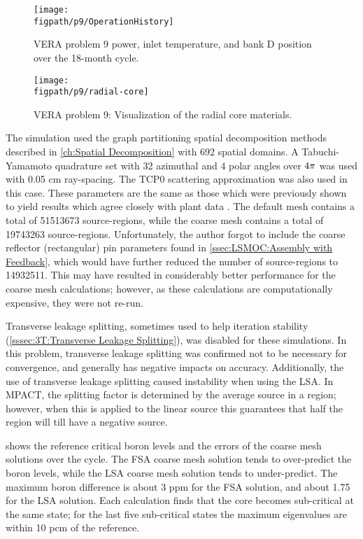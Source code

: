 {{{      \begin{figure}[h]
        \centering
        \texttt{[image: \\figpath/p9/OperationHistory]}
        \caption{VERA problem 9 power, inlet temperature, and bank D position over the 18-month cycle. \label{fig:LSMOC:P9:Operation}}
      \end{figure}

      \begin{figure}[h]
        \centering
        \texttt{[image: \\figpath/p9/radial-core]}
        \caption{VERA problem 9: Visualization of the radial core materials. \label{fig:LSMOC:P9:Radial Core}}
      \end{figure}

      The simulation used the graph partitioning spatial decomposition methods described in \cref{ch:Spatial Decomposition} with 692 spatial domains.
      A Tabuchi-Yamamoto quadrature set with 32 azimuthal and 4 polar angles over $4\pi$ was used with 0.05 cm ray-spacing.
      The TCP0 scattering approximation was also used in this case.
      These parameters are the same as those which were previously shown to yield results which agree closely with plant data \cite{VERA}.
      The default mesh contains a total of 51513673 source-regions, while the coarse mesh contains a total of 19743263 source-regions.
      Unfortunately, the author forgot to include the coarse reflector (rectangular) pin parameters found in \cref{ssec:LSMOC:Assembly with Feedback}, which would have further reduced the number of source-regions to 14932511.
      This may have resulted in considerably better performance for the coarse mesh calculations; however, as these calculations are computationally expensive, they were not re-run.

      Transverse leakage splitting, sometimes used to help iteration stability (\cref{sssec:3T:Transverse Leakage Splitting}), was disabled for these simulations.
      In this problem, transverse leakage splitting was confirmed not to be necessary for convergence, and generally has negative impacts on accuracy.
      Additionally, the use of transverse leakage splitting caused instability when using the \ac{LSA}.
      In MPACT, the splitting factor is determined by the average source in a region; however, when this is applied to the linear source this guarantees that half the region will till have a negative source.

       shows the reference critical boron levels and the errors of the coarse mesh solutions over the cycle.
      The \ac{FSA} coarse mesh solution tends to over-predict the boron levels, while the \ac{LSA} coarse mesh solution tends to under-predict.
      The maximum boron difference is about 3 ppm for the \ac{FSA} solution, and about 1.75 for the \ac{LSA} solution.
      Each calculation finds that the core becomes sub-critical at the same state; for the last five sub-critical states the maximum eigenvalues are within 10 pcm of the reference.

}}}

